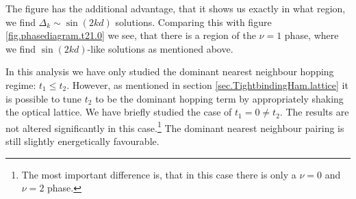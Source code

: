 The figure has the additional advantage, that it shows us exactly in what region, we find $\Delta_k \sim \sin(2kd)$ solutions. Comparing this with figure \ref{fig.phasediagram.t21.0} we see, that there is a region of the $\nu = 1$ phase, where we find $\sin(2kd)$-like solutions as mentioned above. 

In this analysis we have only studied the dominant nearest neighbour hopping regime: $t_1 \leq t_2$. However, as mentioned in section \ref{sec.TightbindingHam.lattice} it is possible to tune $t_2$ to be the dominant hopping term by appropriately shaking the optical lattice. We have briefly studied the case of $t_1 = 0 \neq t_2$. The results are not altered significantly in this case.\footnote{The most important difference is, that in this case there is only a $\nu = 0$ and $\nu = 2$ phase.} The dominant nearest neighbour pairing is still slightly energetically favourable.

